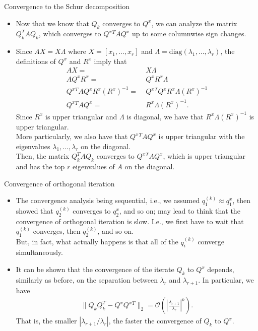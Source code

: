 \documentclass[t,usepdftitle=false]{beamer}
\begin{document}
\begin{frame}{Convergence to the Schur decomposition}
\begin{itemize}
\item Now that we know that $Q_k$ converges to $Q^x$, we can analyze the matrix $Q_k^TAQ_k$, which converges to $Q^x{}^TAQ^x$ up to some columnwise sign changes.
\item Since $AX=X\Lambda$ where $X=[x_1,\dots,x_r]$ and $\Lambda=\mathrm{diag}(\lambda_1,\dots,\lambda_r)$, the definitions of $Q^x$ and $R^x$ imply that
\begin{align*}
AX=&\;X\Lambda\\
AQ^xR^x=&\;Q^xR^x\Lambda\\
Q^x{}^TAQ^xR^x(R^x)^{-1}=&\;Q^x{}^TQ^xR^x\Lambda(R^x)^{-1}\\
Q^x{}^TAQ^x=&\;R^x\Lambda(R^x)^{-1}.
\end{align*}
Since $R^x$ is upper triangular and $\Lambda$ is diagonal, we have that $R^x\Lambda(R^x)^{-1}$ is upper triangular.\vspace{.1cm}\\
More particularly, we also have that $Q^x{}^TAQ^x$ is upper triangular with the eigenvalues $\lambda_1,\dots,\lambda_r$ on the diagonal.\vspace{.1cm}\\
Then, the matrix $Q^T_kAQ_k$ converges to $Q^x{}^TAQ^x$, which is upper triangular and has the top $r$ eigenvalues of $A$ on the diagonal.
\end{itemize}
\end{frame}

\begin{frame}{Convergence of orthogonal iteration}
\begin{itemize}
\item The convergence analysis being sequential, i.e., we assumed $q_1^{(k)}\approx q_1^x$, then showed that $q_2^{(k)}$ converges to $q_2^x$, and so on; may lead to think that the convergence of orthogonal iteration is slow.
I.e., we first have to wait that $q_1^{(k)}$ converges, then $q_2^{(k)}$, and so on.\vspace{.1cm}\\
But, in fact, what actually happens is that all of the $q_i^{(k)}$ converge simultaneously.
\item It can be shown that the convergence of the iterate $Q_k$ to $Q^x$ depends, similarly as before, on the separation between $\lambda_r$ and $\lambda_{r+1}$. In particular, we have
\begin{align*}
\|Q_kQ_k^T-Q^xQ^x{}^T\|_2=\mathcal{O}\left(\left|\frac{\lambda_{r+1}}{\lambda_r}\right|^k\right).
\end{align*}
That is, the smaller $|\lambda_{r+1}/\lambda_r|$, the faster the convergence of $Q_k$ to $Q^x$.
\end{itemize}
\end{frame}
\end{document}

